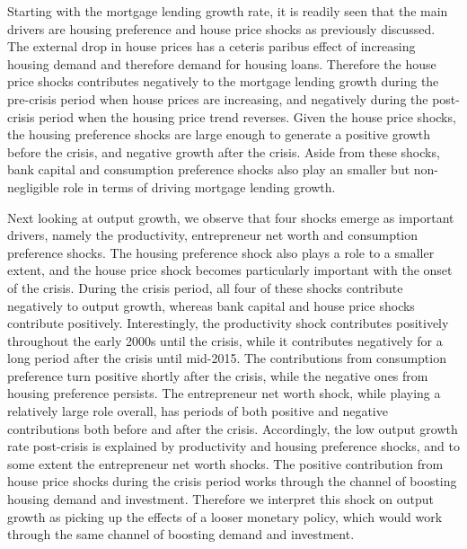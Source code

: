 \documentclass[12pt]{article}
\numberwithin{equation}{section}
\begin{document}
Starting with the mortgage lending growth rate, it is readily seen that the main drivers are housing preference and house price shocks as previously discussed. The external drop in house prices has a ceteris paribus effect of increasing housing demand and therefore demand for housing loans. Therefore the house price shocks contributes negatively to the mortgage lending growth during the pre-crisis period when house prices are increasing, and negatively during the post-crisis period when the housing price trend reverses. Given the house price shocks, the housing preference shocks are large enough to generate a positive growth before the crisis, and negative growth after the crisis. Aside from these shocks, bank capital and consumption preference shocks also play an smaller but non-negligible role in terms of driving mortgage lending growth. 

Next looking at output growth, we observe that four shocks emerge as important drivers, namely the productivity, entrepreneur net worth and consumption preference shocks. The housing preference shock also plays a role to a smaller extent, and the house price shock becomes particularly important with the onset of the crisis.  During the crisis period, all four of these shocks contribute negatively to output growth, whereas bank capital and house price shocks contribute positively. Interestingly, the productivity shock contributes positively throughout the early 2000s until the crisis, while it contributes negatively for a long period after the crisis until mid-2015. The contributions from consumption preference turn positive shortly after the crisis, while the negative ones from housing preference persists. The entrepreneur net worth shock, while playing a relatively large role overall, has periods of both positive and negative contributions both before and after the crisis. Accordingly, the low output growth rate post-crisis is explained by productivity and housing preference shocks, and to some extent the entrepreneur net worth shocks. The positive contribution from house price shocks during the crisis period works through the channel of boosting housing demand and investment. Therefore we interpret this shock on output growth as picking up the effects of a looser monetary policy, which would work through the same channel of boosting demand and investment. 
\end{document}
